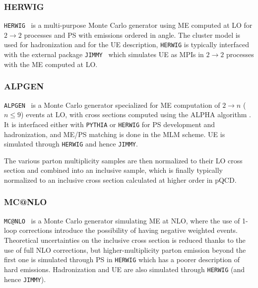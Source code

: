 \subsubsection*{HERWIG}

\texttt{HERWIG}~\cite{HERWIG} is a multi-purpose Monte Carlo generator
using ME computed at LO for $2 \to 2$ processes and PS with emissions ordered in angle. 
The cluster model is used for hadronization and for the UE description, \texttt{HERWIG}
is typically interfaced with the external package \texttt{JIMMY}~\cite{jimmy} which
simulates UE as MPIs in  $2 \to 2$ processes with the ME computed at LO.


\subsubsection*{ALPGEN}

\texttt{ALPGEN}~\cite{ALPGEN} is a Monte Carlo generator specialized for
ME computation of $2 \to n$ ($n\leq 9$) events at LO, with cross sections 
computed using the ALPHA algorithm \cite{ALPGEN_0}. It is interfaced either
with \texttt{PYTHIA} or \texttt{HERWIG} for PS development 
and hadronization, and ME/PS matching
is done in the MLM scheme. %
UE is simulated through \texttt{HERWIG}
and hence \texttt{JIMMY}.

The various parton multiplicity samples are then normalized to their LO cross section
and combined into an inclusive sample, which is finally typically normalized 
to an inclusive cross section calculated at higher order in pQCD. 


\subsubsection*{MC@NLO}

\texttt{MC@NLO}~\cite{mcatnlo} is a Monte Carlo generator simulating ME at
NLO, where the use of 1-loop corrections introduce the possibility of having
negative weighted events. Theoretical uncertainties on the inclusive cross
section is reduced thanks to the use of full NLO corrections, but higher-multiplicity
parton emission beyond the first one is simulated through PS in \texttt{HERWIG} which has
a poorer description of hard emissions. 
Hadronization and UE are also simulated through \texttt{HERWIG}
(and hence \texttt{JIMMY}).

